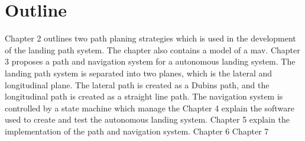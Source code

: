 \section{Outline}
Chapter 2 outlines two path planing strategies which is used in the development of the landing path system. The chapter also contains a model of a \gls{mav}.
Chapter 3 proposes a path and navigation system for a autonomous landing system. The landing path system is separated into two planes, which is the lateral and longitudinal plane. The lateral path is created as a Dubins path, and the longitudinal path is created as a straight line path. The navigation system is controlled by a state machine which manage the 
Chapter 4 explain the software used to create and test the autonomous landing system.
Chapter 5 explain the implementation of the path and navigation system.
Chapter 6 
Chapter 7
\cleardoublepage
